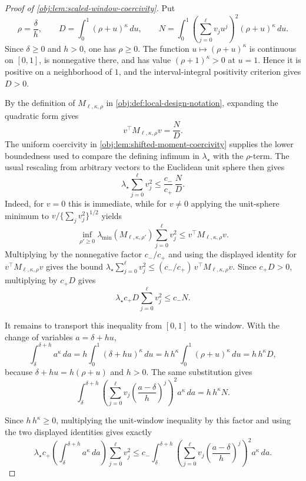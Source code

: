 \begin{proof}[Proof of \cref{obj:lem:scaled-window-coercivity}]
Put
\[
\rho=\frac{\delta}{h},\qquad
D=\int_0^1(\rho+u)^\kappa\,du,\qquad
N=\int_0^1
\left(\sum_{j=0}^{\ell}v_j u^j\right)^2(\rho+u)^\kappa\,du .
\]
Since \(\delta\ge0\) and \(h>0\), one has \(\rho\ge0\).  The function
\(u\mapsto(\rho+u)^\kappa\) is continuous on \([0,1]\), is nonnegative there, and has value \((\rho+1)^\kappa>0\) at \(u=1\).  Hence it is positive on a neighborhood of \(1\), and the interval-integral positivity criterion gives \(D>0\).

By the definition of \(M_{\ell,\kappa,\rho}\) in \cref{obj:def:local-design-notation}, expanding the quadratic form gives
\[
v^\top M_{\ell,\kappa,\rho}v=\frac{N}{D}.
\]
The uniform coercivity in \cref{obj:lem:shifted-moment-coercivity} supplies the lower boundedness used to compare the defining infimum in \(\lambda_\star\) with the \(\rho\)-term.  The usual rescaling from arbitrary vectors to the Euclidean unit sphere then gives
\[
\lambda_\star\sum_{j=0}^{\ell}v_j^2
\le
\frac{c_-}{c_+}\,
\frac{N}{D}.
\]
Indeed, for \(v=0\) this is immediate, while for \(v\ne0\) applying the unit-sphere minimum to
\(v/\{\sum_jv_j^2\}^{1/2}\) yields
\[
\inf_{\rho'\ge0}\lambda_{\min}(M_{\ell,\kappa,\rho'})
\sum_{j=0}^{\ell}v_j^2
\le
v^\top M_{\ell,\kappa,\rho}v .
\]
Multiplying by the nonnegative factor \(c_-/c_+\) and using the displayed identity for \(v^\top M_{\ell,\kappa,\rho}v\) gives the bound
\(\lambda_\star\sum_{j=0}^{\ell}v_j^2\le(c_-/c_+)\,v^\top M_{\ell,\kappa,\rho}v\).  Since \(c_+D>0\), multiplying by \(c_+D\) gives
\[
\lambda_\star c_+D\sum_{j=0}^{\ell}v_j^2
\le c_-N .
\]

It remains to transport this inequality from \([0,1]\) to the window.  With the change of variables
\(a=\delta+hu\),
\[
\int_{\delta}^{\delta+h}a^\kappa\,da
=
h\int_0^1(\delta+hu)^\kappa\,du
=
h\,h^\kappa
\int_0^1(\rho+u)^\kappa\,du
=
h\,h^\kappa D,
\]
because \(\delta+hu=h(\rho+u)\) and \(h>0\).  The same substitution gives
\[
\int_{\delta}^{\delta+h}
\left(\sum_{j=0}^{\ell}v_j\left(\frac{a-\delta}{h}\right)^j\right)^2
a^\kappa\,da
=
h\,h^\kappa N .
\]

Since \(h\,h^\kappa\ge0\), multiplying the unit-window inequality by this factor and using the two displayed identities gives exactly
\[
\lambda_\star c_+
\left(\int_{\delta}^{\delta+h}a^\kappa\,da\right)
\sum_{j=0}^{\ell}v_j^2
\le
c_-
\int_{\delta}^{\delta+h}
\left(\sum_{j=0}^{\ell}
v_j\left(\frac{a-\delta}{h}\right)^j\right)^2
a^\kappa\,da .
\]
\end{proof}
